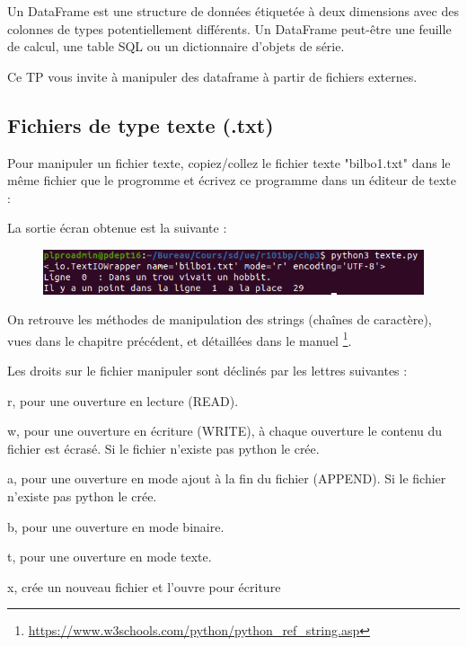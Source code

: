 
Un DataFrame est une structure de données étiquetée à deux dimensions avec des colonnes de types potentiellement différents. Un DataFrame peut-être une feuille de calcul, une table SQL ou un dictionnaire d'objets de série.

Ce TP vous invite à manipuler des dataframe à partir de fichiers externes.

\subsection{Fichiers de type texte (.txt)}




Pour manipuler un fichier texte, copiez/collez le fichier texte "bilbo1.txt" dans le même fichier que le progromme et écrivez ce programme dans un éditeur de texte :



La sortie écran obtenue est la suivante : 

\begin{figure}[H]
    \centering
    \includegraphics[scale = 0.5]{chapitre3/figures/texte.png}
\end{figure}

On retrouve les méthodes de manipulation des strings (chaînes de caractère), vues dans le chapitre précédent, et détaillées dans le manuel
\footnote{\url{https://www.w3schools.com/python/python_ref_string.asp}}.

\begin{tcolorbox}[lefttitle=2cm, colframe=gray!75!blue, title= \textbf{Tip for Code 1 : "\textit{les Droits}"}]

Les droits sur le fichier manipuler sont déclinés par les lettres suivantes :

r, pour une ouverture en lecture (READ).

w, pour une ouverture en écriture (WRITE), à chaque ouverture le contenu du fichier est écrasé. Si le fichier n'existe pas python le crée.

a, pour une ouverture en mode ajout à la fin du fichier (APPEND). Si le fichier n'existe pas python le crée.

b, pour une ouverture en mode binaire.

t, pour une ouverture en mode texte.

x, crée un nouveau fichier et l'ouvre pour écriture


\end{tcolorbox}



